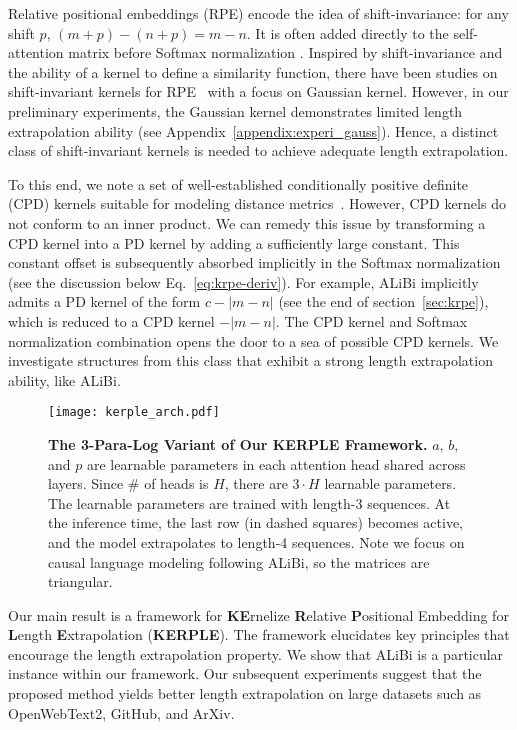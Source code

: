 Relative positional embeddings (RPE) encode the idea of shift-invariance: for any shift $p$, $(m+p)-(n+p)=m-n$. It is often added directly to the self-attention matrix before Softmax normalization \citep{chen2021simple}. Inspired by shift-invariance and the ability of a kernel to define a similarity function, there have been studies on shift-invariant kernels for RPE~\citep{wennberg2021case} with a focus on Gaussian kernel. However, in our preliminary experiments, the Gaussian kernel demonstrates limited length extrapolation ability (see Appendix~\ref{appendix:experi_gauss}). Hence, a distinct class of shift-invariant kernels is needed to achieve adequate length extrapolation.

To this end, we note a set of well-established conditionally positive definite (CPD) kernels suitable for modeling distance metrics~\citep{Schplkopf2000cpd}. However, CPD kernels do not conform to an inner product. We can remedy this issue by transforming a CPD kernel into a PD kernel by adding a sufficiently large constant. This constant offset is subsequently absorbed implicitly in the Softmax normalization (see the discussion below Eq.~\eqref{eq:krpe-deriv}).
For example, ALiBi implicitly admits a PD kernel of the form $c-|m-n|$ (see the end of section~\ref{sec:krpe}), which is reduced to a CPD kernel $-|m-n|$. The CPD kernel and Softmax normalization combination opens the door to a sea of possible CPD kernels. We investigate structures from this class that exhibit a strong length extrapolation ability, like ALiBi.

\begin{figure*}[t]
\centering
\caption{\textbf{The 3-Para-Log Variant of Our KERPLE Framework.} $a$, $b$, and $p$ are learnable parameters in each attention head shared across layers. Since \# of heads is $H$, there are $3\cdot H$ learnable parameters. The learnable parameters are trained with length-3 sequences. At the inference time, the last row (in dashed squares) becomes active, and the model extrapolates to length-4 sequences. Note we focus on causal language modeling following ALiBi, so the matrices are triangular.}
\texttt{[image: kerple\_arch.pdf]}
\label{fig:illustration}
\end{figure*}

Our main result is a framework for \textbf{KE}rnelize \textbf{R}elative \textbf{P}ositional Embedding for \textbf{L}ength \textbf{E}xtrapolation (\textbf{KERPLE}). The framework elucidates key principles that encourage the length extrapolation property. We show that ALiBi is a particular instance within our framework. Our subsequent experiments suggest that the proposed method yields better length extrapolation on large datasets such as OpenWebText2, GitHub, and ArXiv.

